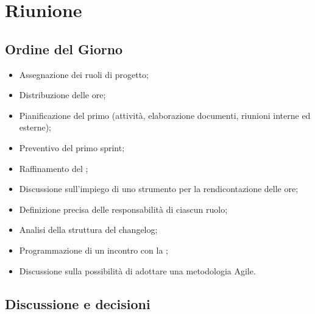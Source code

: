 \section{Riunione}
\subsection{Ordine del Giorno}
\begin{itemize}
	\item Assegnazione dei ruoli di progetto;
	\item Distribuzione delle ore;
	\item Pianificazione del primo  (attività, elaborazione documenti, riunioni interne ed esterne);
	\item Preventivo del primo sprint;
	\item Raffinamento del ;
	\item Discussione sull'impiego di uno strumento per la rendicontazione delle ore;
	\item Definizione precisa delle responsabilità di ciascun ruolo;
	\item Analisi della struttura del changelog;
	\item Programmazione di un incontro con la ;
	\item Discussione sulla possibilità di adottare una metodologia Agile.
\end{itemize}

\subsection{Discussione e decisioni}

